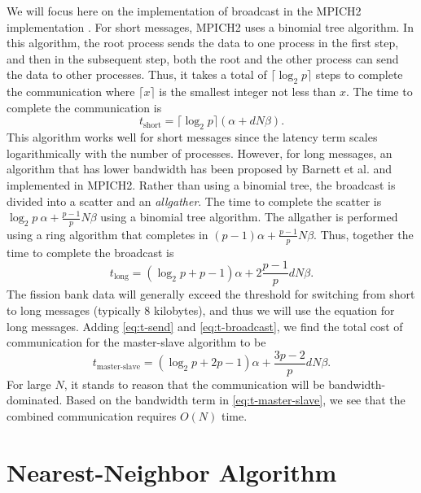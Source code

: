 We will focus here on the implementation of broadcast in the MPICH2
implementation \cite{ijhpca-mpich-2005}. For short messages, MPICH2 uses a
binomial tree algorithm. In this algorithm, the root process sends the data to
one process in the first step, and then in the subsequent step, both the root
and the other process can send the data to other processes. Thus, it takes a
total of $\lceil \log_2 p \rceil$ steps to complete the communication where
$\lceil x \rceil$ is the smallest integer not less than $x$. The time to
complete the communication is
\begin{equation}
  t_{\text{short}} = \lceil \log_2 p \rceil \left ( \alpha + dN\beta \right ).
\end{equation}
This algorithm works well for short messages since the latency term scales
logarithmically with the number of processes. However, for long messages, an
algorithm that has lower bandwidth has been proposed by Barnett et
al. \cite{sc-barnett-1994} and implemented in MPICH2. Rather than using a
binomial tree, the broadcast is divided into a scatter and an
\emph{allgather}. The time to complete the scatter is $ \log_2 p \: \alpha +
\frac{p-1}{p} N\beta$ using a binomial tree algorithm. The allgather is
performed using a ring algorithm that completes in $(p-1) \alpha + \frac{p-1}{p}
N\beta$. Thus, together the time to complete the broadcast is
\begin{equation}
  \label{eq:t-broadcast}
  t_{\text{long}} = \left ( \log_2 p + p - 1 \right ) \alpha + 2 \frac{p-1}{p}
  dN\beta.
\end{equation}
The fission bank data will generally exceed the threshold for switching from
short to long messages (typically 8 kilobytes), and thus we will use the
equation for long messages. Adding \eqref{eq:t-send} and \eqref{eq:t-broadcast},
we find the total cost of communication for the master-slave algorithm to be
\begin{equation}
  \label{eq:t-master-slave}
  t_{\text{master-slave}} = \left ( \log_2 p + 2p - 1 \right ) \alpha +
  \frac{3p-2}{p} dN\beta.
\end{equation}
For large $N$, it stands to reason that the communication will be
bandwidth-dominated. Based on the bandwidth term in \eqref{eq:t-master-slave},
we see that the combined communication requires $O(N)$ time.

\section{Nearest-Neighbor Algorithm}
\label{sec:nearest-neighbor}

